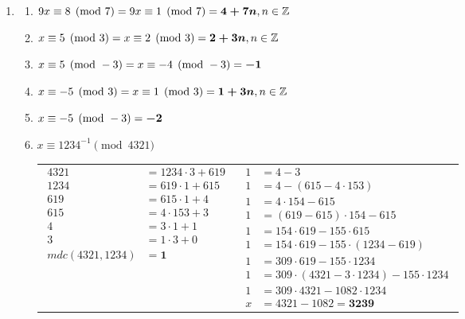 \documentclass[fleqn]{../sftex/sftex}
\begin{document}
\begin{enumerate}[label= (\textbf{\arabic*})]
\begin{enumerate}
\end{enumerate}

\item

\begin{enumerate}

\item $9x \equiv 8 \pmod{7} \\
= 9x \equiv 1 \pmod{7} \\
= \boldsymbol{4 + 7n}, n \in \mathbb{Z}$

\item $x \equiv 5 \pmod{3} \\
= x \equiv 2 \pmod{3} \\
= \boldsymbol{2 + 3n}, n \in \mathbb{Z}$

\item $x \equiv 5 \pmod{-3} \\
= x \equiv -4 \pmod{-3} \\
= \boldsymbol{-1}$

\item $x \equiv -5 \pmod{3} \\
= x \equiv 1 \pmod{3} \\
= \boldsymbol{1 + 3n}, n \in \mathbb{Z}$

\item $x \equiv -5 \pmod{-3} \\
= \boldsymbol{-2}$

\item $x \equiv 1234^{-1} \pmod{4321}$

\begin{tabular}{*{2}{c}}
$\begin{aligned}
4321 &= 1234 \cdot 3 + 619 \\
1234 &= 619 \cdot 1 + 615 \\
619 &= 615 \cdot 1 + 4 \\
615 &= 4 \cdot 153 + 3 \\
4 &= 3 \cdot 1 + 1 \\
3 &= 1 \cdot 3 + 0 \\
mdc(4321, 1234) &= \boldsymbol{1}
\end{aligned}$ &
$\begin{aligned}
1 &= 4 - 3 \\
1 &= 4 - (615 - 4 \cdot 153) \\
1 &= 4 \cdot 154 - 615 \\
1 &= (619 - 615) \cdot 154 - 615 \\
1 &= 154 \cdot 619 - 155 \cdot 615 \\
1 &= 154 \cdot 619 - 155 \cdot (1234 - 619) \\
1 &= 309 \cdot 619 - 155 \cdot 1234 \\
1 &= 309 \cdot (4321 - 3 \cdot 1234) - 155 \cdot 1234 \\
1 &= 309 \cdot 4321 - 1082 \cdot 1234 \\
x &= 4321 - 1082 = \boldsymbol{3239}
\end{aligned}$
\end{tabular}


\end{enumerate}
\end{enumerate}
\end{document}
